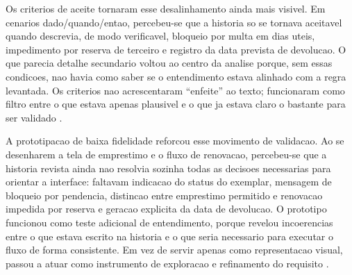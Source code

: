 ﻿\documentclass[12pt]{article}
\begin{document}
%
Os criterios de aceite tornaram esse desalinhamento ainda mais visivel. Em cenarios dado/quando/entao, percebeu-se que a historia so se tornava aceitavel quando descrevia, de modo verificavel, bloqueio por multa em dias uteis, impedimento por reserva de terceiro e registro da data prevista de devolucao. O que parecia detalhe secundario voltou ao centro da analise porque, sem essas condicoes, nao havia como saber se o entendimento estava alinhado com a regra levantada. Os criterios nao acrescentaram ``enfeite'' ao texto; funcionaram como filtro entre o que estava apenas plausivel e o que ja estava claro o bastante para ser validado \cite{hickey2004unified,lucassen2016qus}.

%
A prototipacao de baixa fidelidade reforcou esse movimento de validacao. Ao se desenharem a tela de emprestimo e o fluxo de renovacao, percebeu-se que a historia revista ainda nao resolvia sozinha todas as decisoes necessarias para orientar a interface: faltavam indicacao do status do exemplar, mensagem de bloqueio por pendencia, distincao entre emprestimo permitido e renovacao impedida por reserva e geracao explicita da data de devolucao. O prototipo funcionou como teste adicional de entendimento, porque revelou incoerencias entre o que estava escrito na historia e o que seria necessario para executar o fluxo de forma consistente. Em vez de servir apenas como representacao visual, passou a atuar como instrumento de exploracao e refinamento do requisito \cite{filipovic2021mockups}.
\end{document}
